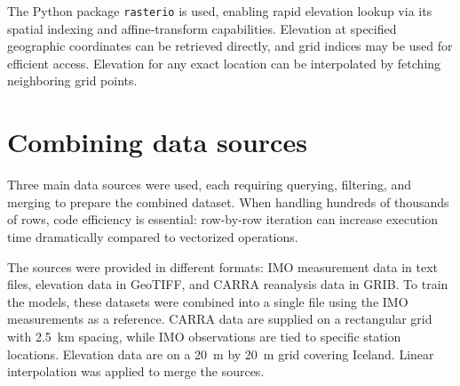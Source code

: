 The Python package \texttt{rasterio} is used, enabling rapid elevation lookup via its spatial indexing and affine‐transform capabilities. Elevation at specified geographic coordinates can be retrieved directly, and grid indices may be used for efficient access. Elevation for any exact location can be interpolated by fetching neighboring grid points.

\section{Combining data sources}

Three main data sources were used, each requiring querying, filtering, and merging to prepare the combined dataset. When handling hundreds of thousands of rows, code efficiency is essential: row-by-row iteration can increase execution time dramatically compared to vectorized operations.

The sources were provided in different formats: IMO measurement data in text files, elevation data in GeoTIFF, and CARRA reanalysis data in GRIB. To train the models, these datasets were combined into a single file using the IMO measurements as a reference. CARRA data are supplied on a rectangular grid with 2.5~km spacing, while IMO observations are tied to specific station locations. Elevation data are on a 20~m by 20~m grid covering Iceland. Linear interpolation was applied to merge the sources.

